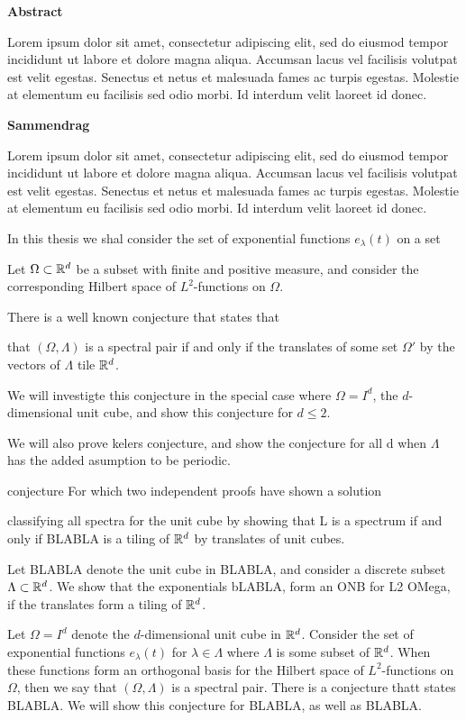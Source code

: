 




\thispagestyle{plain}

\begin{center}\textsf{\textbf{\large Abstract}}\end{center} 

Lorem ipsum dolor sit amet, consectetur adipiscing elit, sed do eiusmod tempor incididunt ut labore et dolore magna aliqua. Accumsan lacus vel facilisis volutpat est velit egestas. Senectus et netus et malesuada fames ac turpis egestas. Molestie at elementum eu facilisis sed odio morbi. Id interdum velit laoreet id donec.

\begin{center}\textsf{\textbf{\large Sammendrag}}\end{center} 

Lorem ipsum dolor sit amet, consectetur adipiscing elit, sed do eiusmod tempor incididunt ut labore et dolore magna aliqua. Accumsan lacus vel facilisis volutpat est velit egestas. Senectus et netus et malesuada fames ac turpis egestas. Molestie at elementum eu facilisis sed odio morbi. Id interdum velit laoreet id donec.


 
In this thesis we shal consider the set of exponential functions $e_\lambda(t)$ on a set 

Let $\Omega\subset \mathbb{R}^d$ be a subset with finite and positive measure, and consider the corresponding Hilbert space of $L^2$-functions on $\Omega$. 

There is a well known conjecture that states that 

that $(\Omega,\Lambda)$ is a spectral pair if and only if the translates of some set $\Omega'$ by the vectors of $\Lambda$ tile $\mathbb{R}^d$. 

We will investigte this conjecture in the special case where $\Omega=I^d$, the $d$-dimensional unit cube, and show this conjecture for $d\leq2$. 

We will also prove kelers conjecture, and show the conjecture for all d when $\Lambda$ has the added asumption to be periodic. 


conjecture For which two independent proofs have shown a solution

classifying all spectra for the unit cube by showing that L is a spectrum if and only if BLABLA is a tiling of $\mathbb{R}^d$ by translates of unit cubes. 

Let BLABLA denote the unit cube in BLABLA, and consider a discrete subset $\Lambda\subset \mathbb{R}^d$. We show that the exponentials bLABLA, form an ONB for L2 OMega, if the translates form a tiling of $\mathbb{R}^d$. 


Let $\Omega=I^d$ denote the $d$-dimensional unit cube in $\mathbb{R}^d$. Consider the set of exponential functions $e_\lambda(t)$ for $\lambda \in \Lambda$ where $\Lambda$ is some subset of $\mathbb{R}^d$. When these functions form an orthogonal basis for the Hilbert space of $L^2$-functions on $\Omega$, then we say that $(\Omega,\Lambda)$ is a spectral pair. There is a conjecture thatt states BLABLA.
We will show this conjecture for BLABLA, as well as BLABLA.

